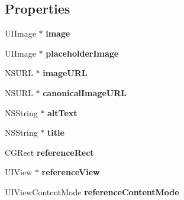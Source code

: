 \subsection*{Properties}
\begin{DoxyCompactItemize}
\item 
\hypertarget{interface_j_t_s_image_info_a526f5e8da7f9b6e10d926a8328812e75}{}U\+I\+Image $\ast$ {\bfseries image}\label{interface_j_t_s_image_info_a526f5e8da7f9b6e10d926a8328812e75}

\item 
\hypertarget{interface_j_t_s_image_info_a01ed89e5787bb1a12242ccef6fb7ee53}{}U\+I\+Image $\ast$ {\bfseries placeholder\+Image}\label{interface_j_t_s_image_info_a01ed89e5787bb1a12242ccef6fb7ee53}

\item 
\hypertarget{interface_j_t_s_image_info_a7ff774164f0b53eac52a85524c7a3db5}{}N\+S\+U\+R\+L $\ast$ {\bfseries image\+U\+R\+L}\label{interface_j_t_s_image_info_a7ff774164f0b53eac52a85524c7a3db5}

\item 
\hypertarget{interface_j_t_s_image_info_adea4dd186339e983344672879dca1310}{}N\+S\+U\+R\+L $\ast$ {\bfseries canonical\+Image\+U\+R\+L}\label{interface_j_t_s_image_info_adea4dd186339e983344672879dca1310}

\item 
\hypertarget{interface_j_t_s_image_info_a298fa2d3b2541f433dbbf39b4881580d}{}N\+S\+String $\ast$ {\bfseries alt\+Text}\label{interface_j_t_s_image_info_a298fa2d3b2541f433dbbf39b4881580d}

\item 
\hypertarget{interface_j_t_s_image_info_a5afeedbee7d41c25727d750a676e4f17}{}N\+S\+String $\ast$ {\bfseries title}\label{interface_j_t_s_image_info_a5afeedbee7d41c25727d750a676e4f17}

\item 
\hypertarget{interface_j_t_s_image_info_abab37038f00490b8517f08c3dd9a804a}{}C\+G\+Rect {\bfseries reference\+Rect}\label{interface_j_t_s_image_info_abab37038f00490b8517f08c3dd9a804a}

\item 
\hypertarget{interface_j_t_s_image_info_a4eb5e62f5000d3983592ec4fc125ab47}{}U\+I\+View $\ast$ {\bfseries reference\+View}\label{interface_j_t_s_image_info_a4eb5e62f5000d3983592ec4fc125ab47}

\item 
\hypertarget{interface_j_t_s_image_info_a56c135f35e6ca5a1344396c388b4c16a}{}U\+I\+View\+Content\+Mode {\bfseries reference\+Content\+Mode}\label{interface_j_t_s_image_info_a56c135f35e6ca5a1344396c388b4c16a}


\end{DoxyCompactItemize}
